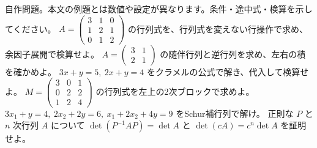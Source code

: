 \documentclass[11pt]{article}
\begin{document}
自作問題。本文の例題とは数値や設定が異なります。条件・途中式・検算を示してください。
\problem[消去と行列式]
$A=\begin{pmatrix}3&1&0\\1&2&1\\0&1&2\end{pmatrix}$ の行列式を、行列式を変えない行操作で求め、余因子展開で検算せよ。
\workspace{45mm}
\problem[随伴行列]
$A=\begin{pmatrix}3&1\\2&1\end{pmatrix}$ の随伴行列と逆行列を求め、左右の積を確かめよ。
\workspace{45mm}
\newpage
\problem[クラメルの公式]
$3x+y=5,\ 2x+y=4$ をクラメルの公式で解き、代入して検算せよ。
\workspace{45mm}
\problem[Schur補行列]
$M=\begin{pmatrix}3&0&1\\0&2&2\\1&2&4\end{pmatrix}$ の行列式を左上の2次ブロックで求めよ。
\workspace{45mm}
\newpage
\problem[内部変数の消去]
$3x_1+y=4,\ 2x_2+2y=6,\ x_1+2x_2+4y=9$ をSchur補行列で解け。
\workspace{45mm}
\problem[行列式と相似]
正則な $P$ と $n$ 次行列 $A$ について $\det(P^{-1}AP)=\det A$ と $\det(cA)=c^n\det A$ を証明せよ。
\workspace{45mm}
\end{document}
